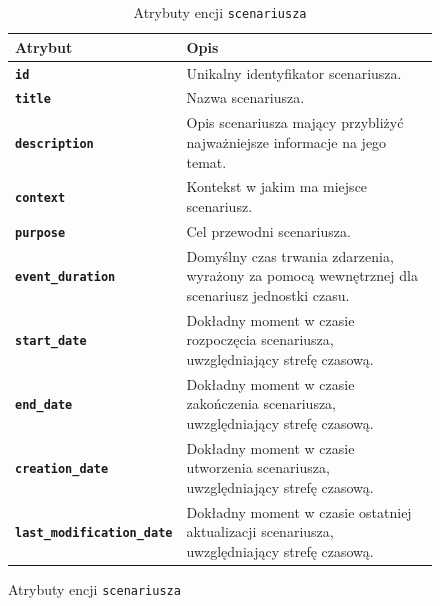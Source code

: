 \begin{figure}[H]
\begin{minipage}{\textwidth}
        \begin{table}[H]
            \centering
            \renewcommand{\arraystretch}{1.6}
            \begin{tabular}{|>{\bfseries}l|p{}|}
                \hline
                \rowcolor[HTML]{EFEFEF} \textbf{Atrybut} & \textbf{Opis} \\
                \hline
                \texttt{id} & Unikalny identyfikator scenariusza. \\
                \hline
                \texttt{title} & Nazwa scenariusza. \\
                \hline
                \texttt{description} & Opis scenariusza mający przybliżyć najważniejsze informacje na jego temat. \\
                \hline
                \texttt{context} & Kontekst w jakim ma miejsce scenariusz. \\
                \hline
                \texttt{purpose} & Cel przewodni scenariusza. \\
                \hline
                \texttt{event\_duration} & Domyślny czas trwania zdarzenia, wyrażony za pomocą wewnętrznej dla scenariusz jednostki czasu. \\
                \hline
                \texttt{start\_date} & Dokładny moment w czasie rozpoczęcia scenariusza, uwzględniający strefę czasową. \\
                \hline
                \texttt{end\_date} & Dokładny moment w czasie zakończenia scenariusza, uwzględniający strefę czasową. \\
                \hline
                \texttt{creation\_date} & Dokładny moment w czasie utworzenia scenariusza, uwzględniający strefę czasową. \\
                \hline
                \texttt{last\_modification\_date} & Dokładny moment w czasie ostatniej aktualizacji scenariusza, uwzględniający strefę czasową. \\
                \hline
            \end{tabular}
            \caption{Atrybuty encji \texttt{scenariusza}}
        \end{table}
    \end{minipage}
\end{figure}

